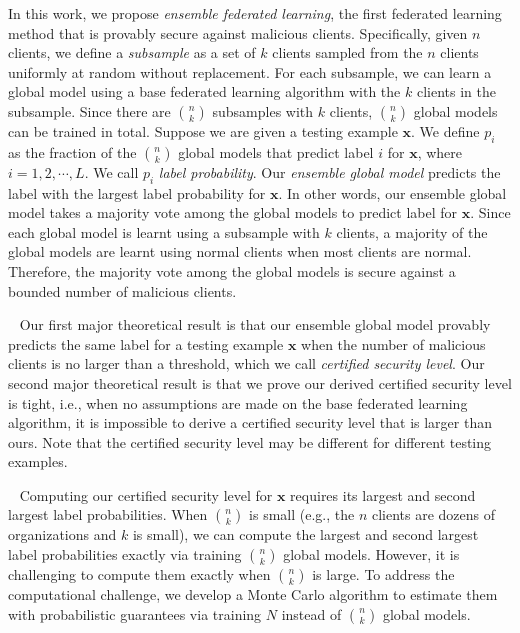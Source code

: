 \documentclass[letterpaper]{article} %
\newcommand{\myparatight}[1]{\smallskip\noindent{\bf {#1}:}~}
\begin{document}
In this work, we propose \emph{ensemble federated learning}, the first federated learning method that is provably secure against malicious clients. Specifically, given $n$ clients, we define a \emph{subsample} as a set of $k$ clients sampled from the $n$ clients uniformly at random without replacement. For each subsample, we can learn a global model using a base federated learning algorithm with the $k$ clients in the subsample. Since there are ${n \choose k}$ subsamples with $k$ clients, ${n \choose k}$ global models can be trained in total. Suppose we are given a testing example $\mathbf{x}$. We define $p_i$ as the fraction of the ${n \choose k}$ global models that predict label $i$ for $\mathbf{x}$, where $i=1,2,\cdots,L$. We call $p_i$ \emph{label probability}. Our \emph{ensemble global model} predicts the label with the largest label probability for $\mathbf{x}$. In other words, our ensemble global model takes a majority vote among the global models to predict label for $\mathbf{x}$. Since each global model is learnt using a subsample with $k$ clients, a majority of the global models are learnt using normal clients when most clients are normal. Therefore, the majority vote among the global models is secure against a bounded number of malicious clients.

\myparatight{Theory} Our first major theoretical result is that our ensemble global model provably predicts the same label for a testing example $\mathbf{x}$ when the number of malicious clients is no larger than a threshold, which we call \emph{certified security level}.  Our second major theoretical result is that we prove our derived certified security level is tight, i.e., when no assumptions are made on the base federated learning algorithm, it is impossible to derive a certified security level that is larger than ours. Note that the certified security level may be different for different testing examples.

\myparatight{Algorithm} Computing our certified security level for $\mathbf{x}$ requires its largest and second largest label probabilities. When ${n \choose k}$ is small (e.g., the $n$ clients are dozens of organizations \cite{kairouz2019advances} and $k$ is small), we can compute the largest and second largest label probabilities exactly via training ${n \choose k}$ global models.
However, it is challenging to compute them exactly when ${n \choose k}$ is large. To address the computational challenge, we develop a Monte Carlo algorithm to estimate them with probabilistic guarantees via training $N$ instead of ${n \choose k}$ global models.
\end{document}
